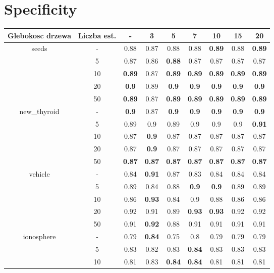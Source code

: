 \documentclass{article}%
\begin{document}
%
\section*{Specificity}%
\begin{longtable}{c|c|ccccccc}%
\hline%
Glebokosc drzewa&Liczba est.&{-}&3&5&7&10&15&20\\%
\hline%
\multirow{5}{*}{seeds}&{-}&0.88&0.87&0.88&0.88&\textbf{0.89}&0.88&\textbf{0.89}\\%
\cline{2%
-%
9}%
&5&0.87&0.86&\textbf{0.88}&0.87&0.87&0.87&0.87\\%
\cline{2%
-%
9}%
&10&\textbf{0.89}&0.87&\textbf{0.89}&\textbf{0.89}&\textbf{0.89}&\textbf{0.89}&\textbf{0.89}\\%
\cline{2%
-%
9}%
&20&\textbf{0.9}&0.89&\textbf{0.9}&\textbf{0.9}&\textbf{0.9}&\textbf{0.9}&\textbf{0.9}\\%
\cline{2%
-%
9}%
&50&\textbf{0.89}&0.87&\textbf{0.89}&\textbf{0.89}&\textbf{0.89}&\textbf{0.89}&\textbf{0.89}\\%
\hline%
\multirow{5}{*}{new\_thyroid}&{-}&\textbf{0.9}&0.87&\textbf{0.9}&\textbf{0.9}&\textbf{0.9}&\textbf{0.9}&\textbf{0.9}\\%
\cline{2%
-%
9}%
&5&0.89&0.9&0.89&0.9&0.9&0.9&\textbf{0.91}\\%
\cline{2%
-%
9}%
&10&0.87&\textbf{0.9}&0.87&0.87&0.87&0.87&0.87\\%
\cline{2%
-%
9}%
&20&0.87&\textbf{0.9}&0.87&0.87&0.87&0.87&0.87\\%
\cline{2%
-%
9}%
&50&\textbf{0.87}&\textbf{0.87}&\textbf{0.87}&\textbf{0.87}&\textbf{0.87}&\textbf{0.87}&\textbf{0.87}\\%
\hline%
\multirow{5}{*}{vehicle}&{-}&0.84&\textbf{0.91}&0.87&0.83&0.84&0.84&0.84\\%
\cline{2%
-%
9}%
&5&0.89&0.84&0.88&\textbf{0.9}&\textbf{0.9}&0.89&0.89\\%
\cline{2%
-%
9}%
&10&0.86&\textbf{0.93}&0.84&0.9&0.88&0.86&0.86\\%
\cline{2%
-%
9}%
&20&0.92&0.91&0.89&\textbf{0.93}&\textbf{0.93}&0.92&0.92\\%
\cline{2%
-%
9}%
&50&0.91&\textbf{0.92}&0.88&0.91&0.91&0.91&0.91\\%
\hline%
\multirow{5}{*}{ionosphere}&{-}&0.79&\textbf{0.84}&0.75&0.8&0.79&0.79&0.79\\%
\cline{2%
-%
9}%
&5&0.83&0.82&0.83&\textbf{0.84}&0.83&0.83&0.83\\%
\cline{2%
-%
9}%
&10&0.81&0.83&\textbf{0.84}&\textbf{0.84}&0.81&0.81&0.81\\%

\end{longtable}
\end{document}

